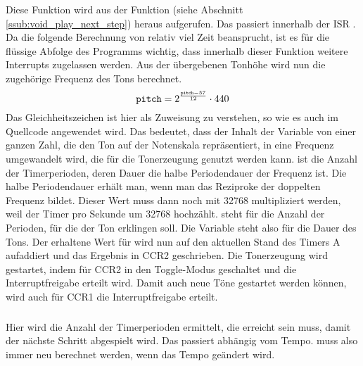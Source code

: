\subsubsection{} %
\label{ssub:void_ton}
Diese Funktion wird aus der Funktion  (siehe Abschnitt \ref{ssub:void_play_next_step}) heraus aufgerufen. Das passiert innerhalb der ISR . Da die folgende Berechnung von  relativ viel Zeit beansprucht, ist es für die flüssige Abfolge des Programms wichtig, dass innerhalb dieser Funktion weitere Interrupts zugelassen werden. Aus der übergebenen Tonhöhe wird nun die zugehörige Frequenz des Tons berechnet.
\[
\texttt{pitch}=2^\frac{\texttt{pitch}-57}{12}\cdot440
\]
Das Gleichheitszeichen ist hier als Zuweisung zu verstehen, so wie es auch im Quellcode angewendet wird. Das bedeutet, dass der Inhalt der Variable  von einer ganzen Zahl, die den Ton auf der Notenskala repräsentiert, in eine Frequenz umgewandelt wird, die für die Tonerzeugung genutzt werden kann.
\newline
{} ist die Anzahl der Timerperioden, deren Dauer die halbe Periodendauer der Frequenz ist. Die halbe Periodendauer erhält man, wenn man das Reziproke der doppelten Frequenz bildet. Dieser Wert muss dann noch mit 32768 multipliziert werden, weil der Timer pro Sekunde um 32768 hochzählt.  steht für die Anzahl der Perioden, für die der Ton erklingen soll. Die Variable steht also für die Dauer des Tons.
\newline
Der erhaltene Wert für  wird nun auf den aktuellen Stand des Timers A aufaddiert und das Ergebnis in CCR2 geschrieben. Die Tonerzeugung wird gestartet, indem für CCR2 in den Toggle-Modus geschaltet und die Interruptfreigabe erteilt wird. Damit auch neue Töne gestartet werden können, wird auch für CCR1 die Interruptfreigabe erteilt.

\subsubsection{} %
\label{ssub:void_update_tempo}
Hier wird die Anzahl der Timerperioden ermittelt, die erreicht sein muss, damit der nächste Schritt abgespielt wird. Das passiert abhängig vom Tempo.  muss also immer neu berechnet werden, wenn das Tempo geändert wird.

